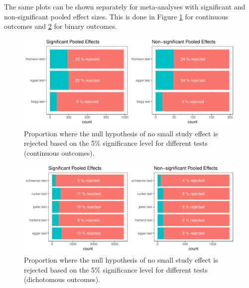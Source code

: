 \documentclass[11pt,a4paper,twoside]{book}\usepackage[]{graphicx}\usepackage[]{color}
\newenvironment{knitrout}{}{} %
\begin{document}
The same plots can be shown separately for meta-analyses with significant and non-significant pooled effect sizes. This is done in Figure \ref{bias.results.cont.sep} for continuous outcomes and \ref{bias.results.bin.sep} for binary outcomes.

\begin{figure}
\begin{knitrout}
\color{fgcolor}

{\centering \includegraphics[width=\textwidth-3cm]{figure/ch02_figunnamed-chunk-22-1} 

}



\end{knitrout}
\caption{Proportion where the null hypothesis of no small study effect is rejected based on the 5\% significance level for different tests (continuous outcomes).}
\label{bias.results.cont.sep}
\end{figure}

\begin{figure}
\begin{knitrout}
\color{fgcolor}

{\centering \includegraphics[width=\textwidth-3cm]{figure/ch02_figunnamed-chunk-23-1} 

}



\end{knitrout}
\caption{Proportion where the null hypothesis of no small study effect is rejected based on the 5\% significance level for different tests (dichotomous outcomes).}
\label{bias.results.bin.sep}
\end{figure}
\end{document}
